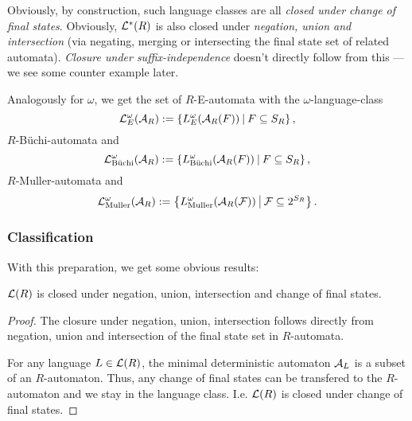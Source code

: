 Obviously, by construction, such language classes are all \emph{closed under change of final states}. Obviously, $\mathcal{L}^*(R)$ is also closed under \emph{negation, union and intersection} (via negating, merging or intersecting the final state set of related automata). \emph{Closure under suffix-independence} doesn't directly follow from this --- we see some counter example later.

\begin{mydef}
Analogously for $\omega$, we get the set of $R$-E-automata with the $\omega$-language-class
\[ \Lang^\omega_E(\A_R) := \Set{L^\omega_E(\A_R(F))}{F \subseteq S_R} , \]
$R$-Büchi-automata and
\[ \Lang^\omega_{\text{Büchi}} (\A_R) := \Set{L^\omega_\text{Büchi}(\A_R(F))}{F \subseteq S_R} , \]
$R$-Muller-automata and
\[ \Lang^\omega_{\text{Muller}} (\A_R) := \Set{L^\omega_\text{Muller}(\A_R(\F))}{\F \subseteq 2^{S_R}} . \]
\end{mydef}


\subsubsection{Classification}

With this preparation, we get some obvious results:
\begin{lemma}
\label{gen:R:closurelemma}
$\mathcal{L}(R)$ is closed under negation, union, intersection and change of final states.
\begin{proof}
The closure under negation, union, intersection follows directly from negation, union and intersection of the final state set in $R$-automata.

For any language $L \in \mathcal{L}(R)$, the minimal deterministic automaton $\mathcal{A}_L$ is a subset of an $R$-automaton. Thus, any change of final states can be transfered to the $R$-automaton and we stay in the language class. I.e. $\mathcal{L}(R)$ is closed under change of final states.
\end{proof}
\end{lemma}

